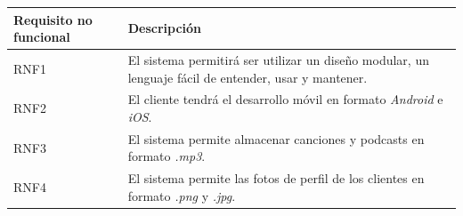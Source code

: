 \documentclass{article}
\begin{document}
\begin{table}[H]
	\begin{tabular}{p{4cm} p{10cm}}
		\hline
		\hline 
		\textbf{Requisito no funcional} & \textbf{Descripción} \\ 
		\hline
		\hline
		RNF1 
		&  El sistema permitirá ser utilizar un diseño modular, un lenguaje fácil de entender, usar y mantener.\\ 
		\hline
		RNF2
		&  El cliente tendrá el desarrollo móvil en formato \textit{Android} e \textit{iOS}.\\ 
		\hline
		RNF3
		& El sistema permite almacenar canciones y podcasts en formato \textit{.mp3}. \\
		\hline
		RNF4
		& El sistema permite las fotos de perfil de los clientes en formato \textit{.png} y \textit{.jpg}. \\
		\hline
	\end{tabular}
\end{table}
\newpage
\end{document}
